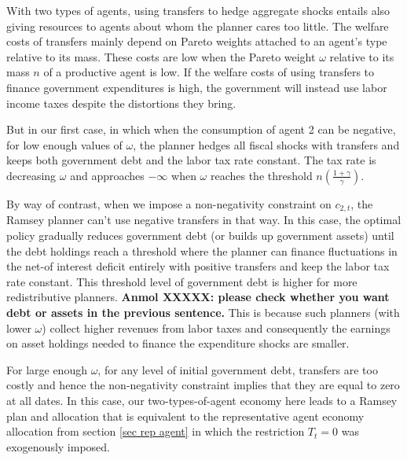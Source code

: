 \documentclass[thmsb,11pt]{article}
\begin{document}
With two types of  agents, using transfers to hedge aggregate shocks entails also giving resources to agents about whom  the planner cares too little.
 The welfare costs of transfers mainly depend on  Pareto weights attached to an agent's type relative to its mass.
                  These costs are low when the Pareto weight $\omega$ relative to its mass $n$ of a productive agent  is low.  If the welfare
                  costs of using transfers to finance government expenditures is high, the government will instead use labor income taxes
                  despite the distortions they bring. 


But in our  first case, in which when the consumption of agent 2 can be  negative, for low enough values of $\omega$, the planner hedges all
 fiscal shocks with transfers and keeps both government debt and the labor tax rate constant. 
  The tax rate is decreasing $\omega$ and approaches $-\infty$ when $\omega$ reaches the threshold $n\left(\frac{1+\gamma}{\gamma}\right).$




By way of contrast, when we impose a non-negativity constraint on $c_{2,t}$, the Ramsey planner can't use negative transfers in that way.
In this case,
the optimal policy gradually reduces government debt (or builds up government assets) until the debt holdings reach a threshold where the planner can finance  fluctuations in the net-of interest deficit entirely with positive transfers and keep the labor tax rate constant. This threshold level of
government  debt is higher for more  redistributive planners. \textbf{Anmol XXXXX: please check whether you want debt or assets in the previous sentence.}  This is because such planners (with lower $\omega$)  collect higher revenues from labor taxes and consequently the earnings on asset holdings needed to finance the expenditure shocks are smaller.

For large enough $\omega$, for any level of initial government debt,  transfers are too costly  and hence the non-negativity constraint implies that they are equal to zero at all dates. In this case, our two-types-of-agent economy here leads to a Ramsey plan and allocation that is equivalent
to the representative agent economy allocation from section  \ref{sec rep agent}  in which the restriction $T_t= 0$ was exogenously imposed.


\end{document}
